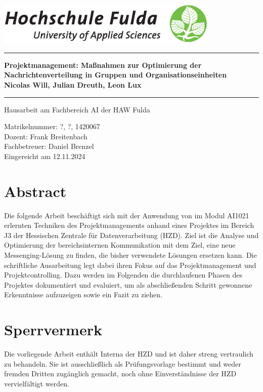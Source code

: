 \documentclass[12pt,oneside]{article}
\newcommand{\HSFTitle}[8]{

  \thispagestyle{empty}
\begin{center}
    \includegraphics[width=0.8\textwidth]{logo.eps} \\
    \vspace*{\stretch{1}}
    \end{center}

  {\parindent0cm
  \rule{\linewidth}{.7ex}}
  \begin{center}
    \vspace*{\stretch{1}}
    \sffamily\bfseries\Huge
    #1\\
    \vspace*{\stretch{1}}
    \sffamily\bfseries\large
    #3
    \vspace*{\stretch{1}}
  \end{center}
  \rule{\linewidth}{.7ex}

  \vspace*{\stretch{2}}
  \begin{center}
    \Large #2 am #5 der HAW Fulda \\
    \vspace*{\stretch{1}}

    \large Matrikelnummer:  #4 \\[1mm]
    \large Dozent:  #7 \\[1mm]
    \large Fachbetreuer:  #8 \\[1mm]

    \vspace*{\stretch{1}}
    \large Eingereicht am #6
  \end{center}
}
\begin{document}
\makeatletter
  \HSFTitle
      {Projektmanagement: Maßnahmen zur Optimierung der Nachrichtenverteilung in Gruppen und Organisationseinheiten }        %
      {Hausarbeit} %
      {Nicolas Will, Julian Dreuth, Leon Lux}          %
      {?, ?, 1420067}
      {Fachbereich AI}  %
      {12.11.2024}        %
      {Frank Breitenbach}     %
      {Daniel Brenzel}    %
  \clearpage

\lhead{}
    \setcounter{page}{1}

\clearpage
%
\section*{Abstract}

Die folgende Arbeit beschäftigt sich mit der Anwendung von im Modul AI1021 erlernten Techniken des Projektmanagements anhand eines Projektes im 
Bereich J3 der Hessischen Zentrale für Datenverarbeitung (HZD). Ziel ist die Analyse und Optimierung der bereichsinternen Kommunikation mit dem Ziel, 
eine neue Messenging-Lösung zu finden, die bisher verwendete Lösungen ersetzen kann. Die schriftliche Ausarbeitung legt dabei ihren Fokus auf 
das Projektmanagement und Projektcontrolling. Dazu werden im Folgenden die durchlaufenen Phasen des Projektes dokumentiert und evaluiert, um als 
abschließenden Schritt gewonnene Erkenntnisse aufzuzeigen sowie ein Fazit zu ziehen.

\section*{Sperrvermerk}
Die vorliegende Arbeit enthält Interna der HZD und ist daher streng vertraulich zu behandeln. Sie ist ausschließlich als Prüfungsvorlage bestimmt und weder
fremden Dritten zugänglich gemacht, noch ohne Einverständnisse der HZD vervielfältigt werden.


\clearpage
\tableofcontents
\clearpage

\listoffigures

\listoftables
\clearpage


\cleardoublepage
{}
    \setcounter{page}{1}
\lhead{\nouppercase{\leftmark}}
\end{document}
